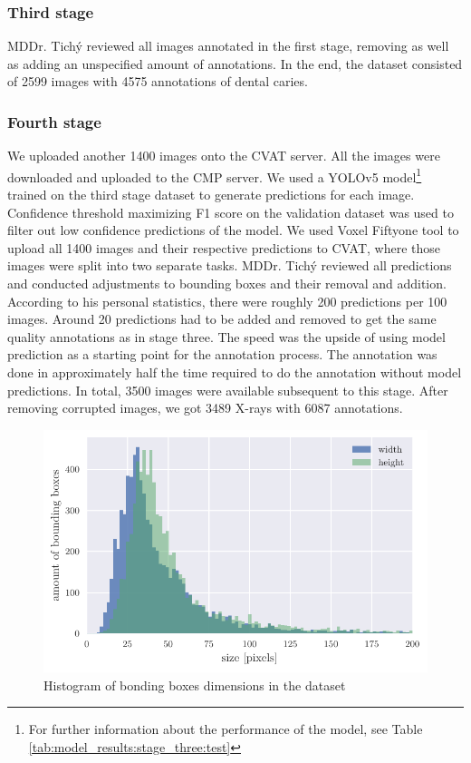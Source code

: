 \subsubsection{Third stage}
\label{sec:dataset:third_stage}
MDDr. Tichý reviewed all images annotated in the first stage, removing as well as adding an unspecified amount of annotations. In the end, the dataset consisted of 2599 images with 4575 annotations of dental caries.

\subsubsection{Fourth stage}
\label{sec:dataset:fourth_stage}
We uploaded another 1400 images onto the CVAT server. All the images were downloaded and uploaded to the CMP server. We used a YOLOv5 model\footnote{For further information about the performance of the model, see Table \ref{tab:model_results:stage_three:test}} trained on the third stage dataset to generate predictions for each image. Confidence threshold maximizing F1 score on the validation dataset was used to filter out low confidence predictions of the model. We used Voxel Fiftyone tool to upload all 1400 images and their respective predictions to CVAT, where those images were split into two separate tasks.
MDDr. Tichý reviewed all predictions and conducted adjustments to bounding boxes and their removal and addition.  According to his personal statistics, there were roughly 200 predictions per 100 images. Around 20 predictions had to be added and removed to get the same quality annotations as in stage three. The speed was the upside of using model prediction as a starting point for the annotation process. The annotation was done in approximately half the time required to do the annotation without model predictions. In total, 3500 images were available subsequent to this stage. After removing corrupted images, we got 3489 X-rays with 6087 annotations.

\begin{figure}
    \includegraphics[width = 0.9\linewidth]{images/dataset_histogram.pdf}
    \caption{Histogram of bonding boxes dimensions in the dataset}
    \label{fig:hist_caries_dim}
\end{figure}

